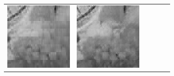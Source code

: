 \documentclass[11pt,a4paper,openright,oneside]{book}
\numberwithin{equation}{section}
\begin{document}
{\begin{figure}[h]
\begin{adjustwidth}{-3cm}{-3cm}
\begin{tabular}{>{\centering\arraybackslash}m{1.5cm} m{2.5cm} m{2.5cm} m{2.5cm} m{2.5cm} m{2.5cm}}
        \includegraphics[width=\linewidth]{media/tnale/AAAfruits-comp3-ale-4.png} & 
        \includegraphics[width=\linewidth]{media/tnale/AAAfruits-comp4-ale-4.png} &

\end{tabular}
\end{adjustwidth}
\end{figure}}
\end{document}
